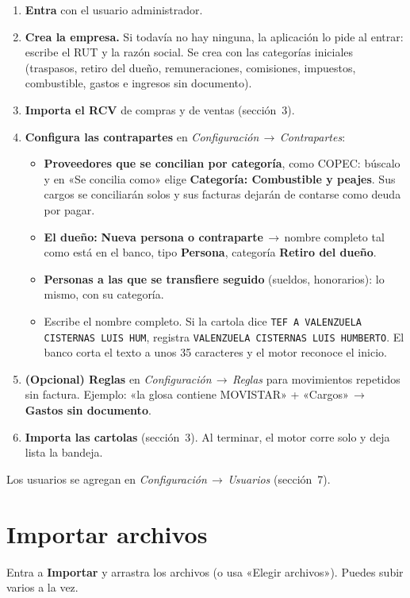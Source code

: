 \documentclass[11pt,a4paper]{article}
\newcommand{\ui}[1]{\textsf{\textbf{#1}}}                       %
\newcommand{\ruta}[1]{\textsf{\textit{#1}}}                      %
\newcommand{\flecha}{\,$\rightarrow$\,}
\newcommand{\cod}[1]{\texttt{#1}}
\begin{document}
\begin{enumerate}
\item \textbf{Entra} con el usuario administrador.
\item \textbf{Crea la empresa.} Si todavía no hay ninguna, la aplicación lo pide al entrar: escribe el RUT y la razón social. Se crea con las categorías iniciales (traspasos, retiro del dueño, remuneraciones, comisiones, impuestos, combustible, gastos e ingresos sin documento).
\item \textbf{Importa el RCV} de compras y de ventas (sección~3).
\item \textbf{Configura las contrapartes} en \ruta{Configuración\flecha Contrapartes}:
  \begin{itemize}
  \item \textbf{Proveedores que se concilian por categoría}, como COPEC: búscalo y en «Se concilia como» elige \ui{Categoría: Combustible y peajes}. Sus cargos se conciliarán solos y sus facturas dejarán de contarse como deuda por pagar.
  \item \textbf{El dueño:} \ui{Nueva persona o contraparte}\flecha nombre completo tal como está en el banco, tipo \ui{Persona}, categoría \ui{Retiro del dueño}.
  \item \textbf{Personas a las que se transfiere seguido} (sueldos, honorarios): lo mismo, con su categoría.
  \item Escribe el nombre completo. Si la cartola dice \cod{TEF A VALENZUELA CISTERNAS LUIS HUM}, registra \cod{VALENZUELA CISTERNAS LUIS HUMBERTO}. El banco corta el texto a unos 35 caracteres y el motor reconoce el inicio.
  \end{itemize}
\item \textbf{(Opcional) Reglas} en \ruta{Configuración\flecha Reglas} para movimientos repetidos sin factura. Ejemplo: «la glosa contiene MOVISTAR» + «Cargos»\flecha \ui{Gastos sin documento}.
\item \textbf{Importa las cartolas} (sección~3). Al terminar, el motor corre solo y deja lista la bandeja.
\end{enumerate}

Los usuarios se agregan en \ruta{Configuración\flecha Usuarios} (sección~7).

\section{Importar archivos}

Entra a \ui{Importar} y arrastra los archivos (o usa «Elegir archivos»). Puedes subir varios a la vez.
\end{document}
